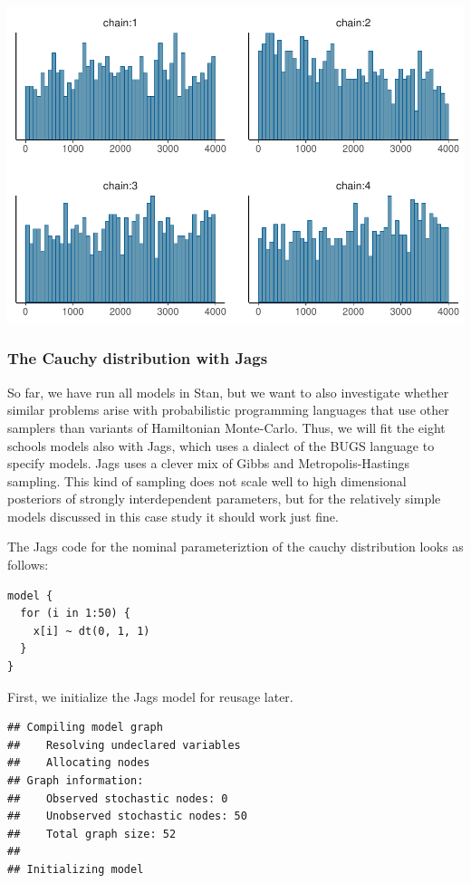\documentclass[american,]{article}
\begin{document}
\includegraphics{graphics/hist-fit-half-reparam-lp-1.pdf}

\hypertarget{the-cauchy-distribution-with-jags}{%
\subsubsection*{The Cauchy distribution with
Jags}\label{the-cauchy-distribution-with-jags}}

So far, we have run all models in Stan, but we want to also investigate
whether similar problems arise with probabilistic programming languages
that use other samplers than variants of Hamiltonian Monte-Carlo. Thus,
we will fit the eight schools models also with Jags, which uses a
dialect of the BUGS language to specify models. Jags uses a clever mix
of Gibbs and Metropolis-Hastings sampling. This kind of sampling does
not scale well to high dimensional posteriors of strongly interdependent
parameters, but for the relatively simple models discussed in this case
study it should work just fine.

The Jags code for the nominal parameteriztion of the cauchy distribution
looks as follows:

\begin{verbatim}
model {
  for (i in 1:50) {
    x[i] ~ dt(0, 1, 1)
  }
}
\end{verbatim}

First, we initialize the Jags model for reusage later.

\begin{verbatim}
## Compiling model graph
##    Resolving undeclared variables
##    Allocating nodes
## Graph information:
##    Observed stochastic nodes: 0
##    Unobserved stochastic nodes: 50
##    Total graph size: 52
## 
## Initializing model
\end{verbatim}
\end{document}
